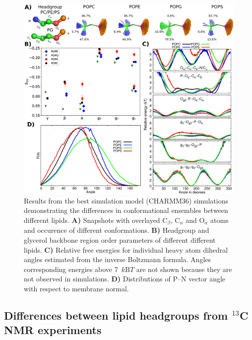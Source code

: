 \documentclass[aps,prl,superscriptaddress,twocolumn]{revtex4}
\begin{document}
\begin{figure}[bt]
  \centering
   \includegraphics[width=18.0cm]{./Figs/figure2.eps}
   \caption{\label{structures}
     Results from the best simulation model (CHARMM36) simulations demonstrating the differences in conformational ensembles between different lipids. 
     \textbf{A)} Snapshots with overlayed C$_\beta$, C$_\alpha$ and O$_\alpha$ atoms and occurence of different conformations.
     \textbf{B)} Headgroup and glycerol backbone region order parameters of different different lipids.
     \textbf{C)} Relative free energies for individual heavy atom dihedral angles estimated from the inverse Boltzmann formula.
     Angles corresponding energies above 7~$k\mathrm{B}T$ are not shown because they are not observed in simulations.
     \textbf{D)} Distributions of P--N vector angle with respect to membrane normal.
  }
\end{figure}


\subsection{Differences between lipid headgroups from $^{13}$C NMR experiments}
\end{document}
